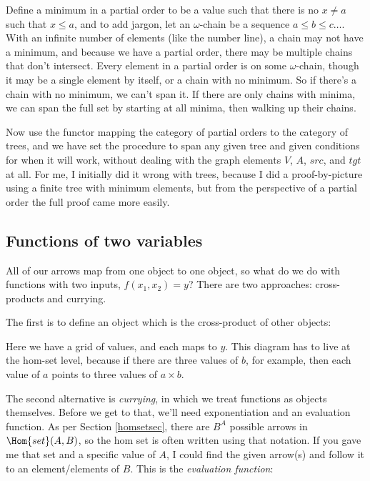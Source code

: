 \documentclass[11pt]{article}
\begin{document}
Define a minimum in a partial order to be a value such that there is no $x\neq a$ such that
$x\leq a$, and to add jargon, let an $\omega$-chain be a sequence $a\leq b\leq
c\dots$. With an infinite number of elements (like the number line), a chain may not have
a minimum, and because we have a partial order, there may be multiple chains that don't
intersect. Every element in a partial order is on some $\omega$-chain, though it may be a
single element by itself, or a chain with no minimum. So if there's a chain with no
minimum, we can't span it.  If there are only chains with minima, we can span the full
set by starting at all minima, then walking up their chains.

Now use the functor mapping the category of partial orders to the category of trees,
and we have set the procedure to span any given tree and given conditions for when it will work,
without dealing with the graph elements $V$, $A$, $src$, and $tgt$ at all.
For me, I initially did it wrong with trees, because I did a proof-by-picture using
a finite tree with minimum elements, but from the perspective of a partial order the
full proof came more easily.

\subsection{Functions of two variables} All of our arrows map from one object to one
object, so what do we do with functions with two inputs, $f(x_1, x_2)=y$? There are two
approaches: cross-products and currying.

The first is to define an object which is the cross-product of other objects:


Here we have a grid of values, and each maps to $y$.
This diagram has to live at the hom-set level, because if there are three values of $b$,
for example, then each value of $a$ points to three values of $a\times b$.

The second alternative is {\em currying}, in which we treat functions as objects
themselves. Before we get to that, we'll need exponentiation and an evaluation function.
As per Section \ref{homsetsec}, there are $B^A$ possible arrows in $\Hom{set}(A, B)$, so
the hom set is often written using that notation. If you gave me that set and a specific
value of $A$, I could find the given arrow(s) and follow it to an element/elements of $B$.
This is the {\em evaluation function}:
\end{document}
